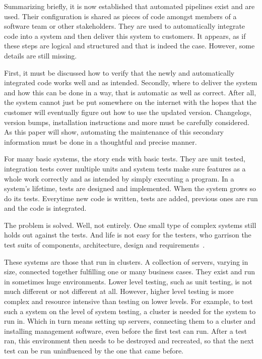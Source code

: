 Summarizing briefly, it is now established that automated pipelines exist and are used.
Their configuration is shared as pieces of code amongst members of a software team or other stakeholders.
They are used to automatically integrate code into a system and then deliver this system to customers.
It appears, as if these steps are logical and structured and that is indeed the case.
However, some details are still missing.

First, it must be discussed how to verify that the newly and automatically integrated code works well and as intended.
Secondly, where to deliver the system and how this can be done in a way, that is automatic as well as correct.
After all, the system cannot just be put somewhere on the internet with the hopes that the customer will eventually figure out how to use the updated version.
Changelogs, version bumps, installation instructions and more must be carefully considered.
As this paper will show, automating the maintenance of this secondary information must be done in a thoughtful and precise manner.

For many basic systems, the story ends with basic tests.
They are unit tested, integration tests cover multiple units and system tests make sure features as a whole work correctly and as intended by simply executing a program.
In a system's lifetime, tests are designed and implemented.
When the system grows so do its tests.
Everytime new code is written, tests are added, previous ones are run and the code is integrated.

The problem is solved.
Well, not entirely.
One small type of complex systems still holds out against the tests.
And life is not easy for the testers, who garrison the test suits of components, architecture, design and requirements~\cite{AsterixBeginningSentence}.

These systems are those that run in clusters.
A collection of servers, varying in size, connected together fulfilling one or many business cases.
They exist and run in sometimes huge environments.
Lower level testing, such as unit testing, is not much different or not different at all.
However, higher level testing is more complex and resource intensive than testing on lower levels.
For example, to test such a system on the level of system testing, a cluster is needed for the system to run in.
Which in turn means setting up servers, connecting them to a cluster and installing management software, even before the first test can run.
After a test ran, this environment then needs to be destroyed and recreated, so that the next test can be run uninfluenced by the one that came before.

